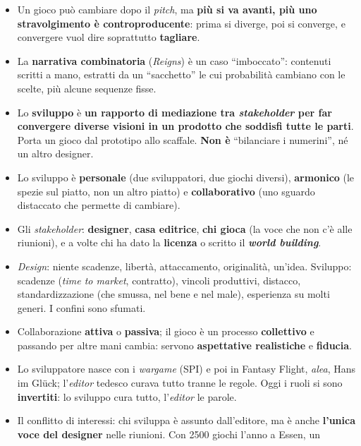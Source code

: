 \begin{itemize}
  \item Un gioco può cambiare dopo il \emph{pitch}, ma \textbf{più si va avanti, più uno
        stravolgimento è controproducente}: prima si diverge, poi si converge, e
        convergere vuol dire soprattutto \textbf{tagliare}.
  \item La \textbf{narrativa combinatoria} (\emph{Reigns}) è un caso ``imboccato'': contenuti
        scritti a mano, estratti da un ``sacchetto'' le cui probabilità cambiano con le
        scelte, più alcune sequenze fisse.
  \item Lo \textbf{sviluppo} è \textbf{un rapporto di mediazione tra \emph{stakeholder} per far
        convergere diverse visioni in un prodotto che soddisfi tutte le parti}. Porta un
        gioco dal prototipo allo scaffale. \textbf{Non è} ``bilanciare i numerini'', né un
        altro designer.
  \item Lo sviluppo è \textbf{personale} (due sviluppatori, due giochi diversi), \textbf{armonico}
        (le spezie sul piatto, non un altro piatto) e \textbf{collaborativo} (uno sguardo
        distaccato che permette di cambiare).
  \item Gli \emph{stakeholder}: \textbf{designer}, \textbf{casa editrice}, \textbf{chi gioca} (la
        voce che non c'è alle riunioni), e a volte chi ha dato la \textbf{licenza} o scritto
        il \textbf{\emph{world building}}.
  \item \emph{Design}: niente scadenze, libertà, attaccamento, originalità, un'idea. Sviluppo:
        scadenze (\emph{time to market}, contratto), vincoli produttivi, distacco,
        standardizzazione (che smussa, nel bene e nel male), esperienza su molti generi. I
        confini sono sfumati.
  \item Collaborazione \textbf{attiva} o \textbf{passiva}; il gioco è un processo
        \textbf{collettivo} e passando per altre mani cambia: servono \textbf{aspettative
        realistiche} e \textbf{fiducia}.
  \item Lo sviluppatore nasce con i \emph{wargame} (SPI) e poi in Fantasy Flight, \emph{alea},
        Hans im Glück; l'\emph{editor} tedesco curava tutto tranne le regole. Oggi i ruoli
        si sono \textbf{invertiti}: lo sviluppo cura tutto, l'\emph{editor} le parole.
  \item Il conflitto di interessi: chi sviluppa è assunto dall'editore, ma è anche
        \textbf{l'unica voce del designer} nelle riunioni. Con 2500 giochi l'anno a Essen, un

\end{itemize}
